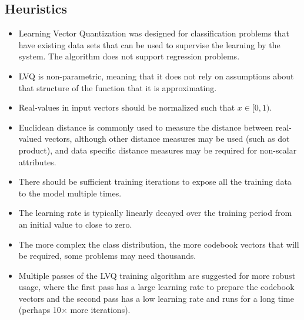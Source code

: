 \subsection{Heuristics}
\begin{itemize}
	\item Learning Vector Quantization was designed for classification problems that have existing data sets that can be used to supervise the learning by the system. The algorithm does not support regression problems.
	\item LVQ is non-parametric, meaning that it does not rely on assumptions about that structure of the function that it is approximating.
	\item Real-values in input vectors should be normalized such that $x \in [0,1)$. 
	\item Euclidean distance is commonly used to measure the distance between real-valued vectors, although other distance measures may be used (such as dot product), and data specific distance measures may be required for non-scalar attributes.
	\item There should be sufficient training iterations to expose all the training data to the model multiple times.
	\item The learning rate is typically linearly decayed over the training period from an initial value to close to zero.
	\item The more complex the class distribution, the more codebook vectors that will be required, some problems may need thousands.
	\item Multiple passes of the LVQ training algorithm are suggested for more robust usage, where the first pass has a large learning rate to prepare the codebook vectors and the second pass has a low learning rate and runs for a long time (perhaps 10$\times$ more iterations).
\end{itemize}

